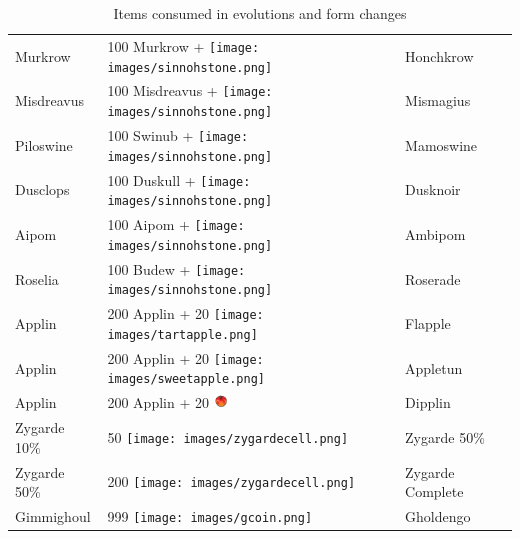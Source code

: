 \begin{table}
\begin{tabular}{lll}
    Murkrow & 100 Murkrow + \texttt{[image: images/sinnohstone.png]} & Honchkrow	\\
    Misdreavus & 100 Misdreavus + \texttt{[image: images/sinnohstone.png]} & Mismagius	\\
    Piloswine & 100 Swinub + \texttt{[image: images/sinnohstone.png]} & Mamoswine	\\
    Dusclops & 100 Duskull + \texttt{[image: images/sinnohstone.png]} & Dusknoir	\\
    Aipom & 100 Aipom + \texttt{[image: images/sinnohstone.png]} & Ambipom	\\
    Roselia & 100 Budew + \texttt{[image: images/sinnohstone.png]} & Roserade	\\
    Applin & 200 Applin + 20 \texttt{[image: images/tartapple.png]} & Flapple \\
    Applin & 200 Applin + 20 \texttt{[image: images/sweetapple.png]} & Appletun \\
    Applin & 200 Applin + 20 \includegraphics[width=1em,height=1em]{images/syrupyapple.png} & Dipplin \\
    Zygarde 10\% & 50 \texttt{[image: images/zygardecell.png]} & Zygarde 50\% \\
    Zygarde 50\% & 200 \texttt{[image: images/zygardecell.png]} & Zygarde Complete \\
    Gimmighoul & 999 \texttt{[image: images/gcoin.png]} & Gholdengo \\
  \end{tabular}
  \caption{Items consumed in evolutions and form changes\label{table:itemevolutions}}
\end{table}

